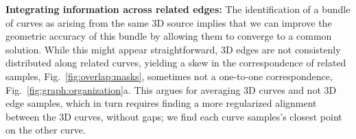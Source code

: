 \documentclass[a4paper,titlepage]{article}
\newtheorem{definition}{Defini��o}
\newcommand{\indraftnote}[1]{\textcolor{blue}{\texttt{\footnotesize [#1]}}}
\newcommand{\Gama}{\boldsymbol{\Gamma}}
\begin{document}



\textbf{Integrating information across related edges:} 
The identification of a bundle of curves as arising from the same 3D source
implies that we can improve the geometric accuracy of this bundle by
allowing them to converge to a common solution. While this might appear
straightforward, 3D edges are not consistenly distributed along related curves,
yielding a skew in the correspondence of related samples,
Fig.~\ref{fig:overlap:masks}, sometimes not a one-to-one
correspondence, Fig.~\ref{fig:graph:organization}a. This argues for averaging 3D
curves and not 3D edge samples, which in turn requires finding a more
regularized alignment between the 3D curves, without gaps; we find each
curve samples's closest point on the other curve.
\end{document}
